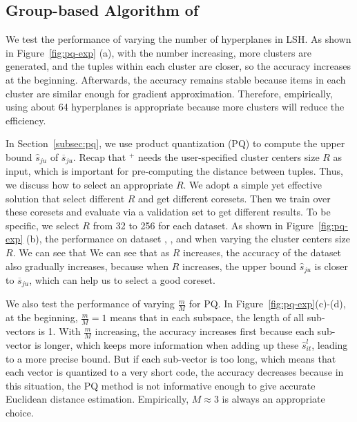 \subsection{Group-based Algorithm of \ours}
 We test the performance of varying the number of hyperplanes in LSH. As shown in Figure~\ref{fig:pq-exp} (a), with the number increasing, more clusters are generated, and the tuples within each cluster are closer, so the  accuracy increases at the beginning. Afterwards, the accuracy remains stable because items in each cluster are similar enough for gradient approximation. Therefore, empirically, using about 64 hyperplanes is appropriate because more clusters will reduce the efficiency.

In Section~\ref{subsec:pq}, we use product quantization (PQ) to compute the upper bound $\hat{s}_{ju}$ of $\overline{s}_{ju}$. Recap that \ours$^+$ needs the user-specified cluster centers size $R$ as input, which is important for pre-computing the distance between tuples. Thus, we discuss how to select an appropriate $R$. We adopt a simple yet effective solution that select different $R$ and get different coresets. Then we train over these coresets and evaluate via a validation set to get different results. To be specific, we select $R$ from 32 to 256 for each dataset. As shown in Figure~\ref{fig:pq-exp} (b), the performance on dataset \hr, \adult, \bike and \imdbl when varying the cluster centers size $R$. We can see that We can see that as $R$ increases, the accuracy of the dataset also gradually increases, because when $R$ increases, the upper bound $\hat{s}_{ju}$ is closer to $\overline{s}_{ju}$, which can help us to select a good coreset.


We also test the performance of varying $\frac{m}{M}$ for PQ. In Figure~\ref{fig:pq-exp}(c)-(d), at the beginning,  $\frac{m}{M}=1$ means that in each subspace, the length of all sub-vectors is 1. With $\frac{m}{M}$ increasing, the accuracy increases first because each sub-vector is longer, which keeps more information when adding up these $\hat{s}^l_{it}$, leading to a more precise bound. But if each sub-vector is too long, which means that each vector is quantized to a very short code, the accuracy decreases because in this situation, the PQ method is not informative enough to give accurate Euclidean distance estimation. Empirically, $M\approx3$ is always an appropriate choice.
